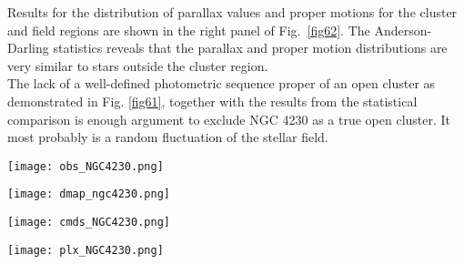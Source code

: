 \documentclass[draft]{aa}
\begin{document}
Results for the distribution of parallax values and proper motions for the
cluster and field regions are shown in the right panel of Fig.~\ref{fig62}.
The Anderson-Darling statistics reveals that the parallax and
proper motion distributions are very similar to stars outside the
cluster region.\\

The lack of a well-defined photometric sequence proper of an open cluster as
demonstrated in Fig. \ref{fig61}, together with the results from
the statistical comparison is enough argument to exclude NGC 4230 as a true open
cluster. It most probably is a random fluctuation of the stellar field.

\begin{figure*}[ht]
    \centering
    \texttt{[image: obs\_NGC4230.png]}
    \caption{Idem Fig. \ref{fig:photom_vdBH85} for NGC 4230.}
    \label{fig59}
\end{figure*}
\begin{figure*}[ht]
    \centering
    \texttt{[image: dmap\_ngc4230.png]}
    \caption{Idem Fig. \ref{fig:struct_vdBH85} for NGC 4230.}
    \label{fig60}
\end{figure*}
\begin{figure*}[ht]
    \centering
    \texttt{[image: cmds\_NGC4230.png]}
    \caption{Idem Fig. \ref{fig:fundpars_vdBH85} for NGC 4230.}
    \label{fig61}
\end{figure*}
\begin{figure*}[ht]
    \centering
    \texttt{[image: plx\_NGC4230.png]}
    \caption{Idem Fig. \ref{fig:plx_bys_vdBH85} for NGC 4230.}
    \label{fig62}
\end{figure*}
\end{document}
